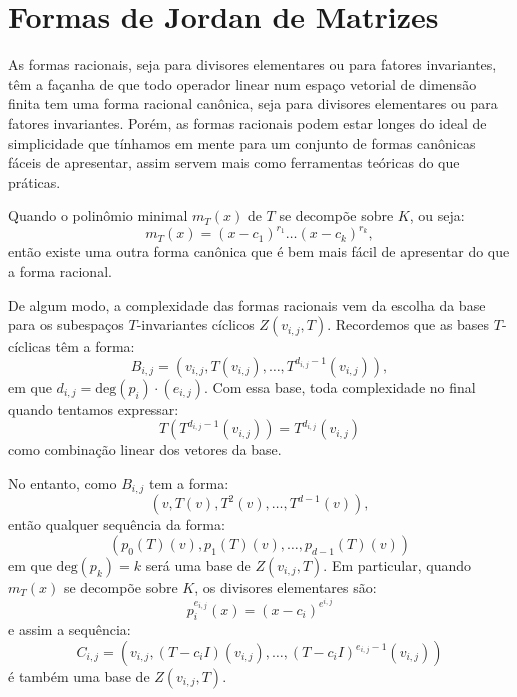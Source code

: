 \documentclass[11pt,twoside,a4paper]{book}
\begin{document}
\section{Formas de Jordan de Matrizes}

As formas racionais, seja para divisores elementares ou para fatores invariantes, têm a façanha de que todo operador linear num espaço vetorial de dimensão finita tem uma forma racional canônica, seja para divisores elementares ou para fatores invariantes. Porém, as formas racionais podem estar longes do ideal de simplicidade que tínhamos em mente para um conjunto de formas canônicas fáceis de apresentar, assim servem mais como ferramentas teóricas do que práticas.

\medskip
\noindent
Quando o polinômio minimal $m_T(x)$ de $T$ se decompõe sobre $K$, ou seja:
\[
m_T(x)=(x-c_1)^{r_1}\dots(x-c_k)^{r_k},
\]
então existe uma outra forma canônica que é bem mais fácil de apresentar do que a forma racional.

\medskip
\noindent
De algum modo, a complexidade das formas racionais vem da escolha da base para os subespaços $T$-invariantes cíclicos $Z(v_{i,j},T)$. Recordemos que as bases $T$-cíclicas
têm a forma:
\[
B_{i,j}=(v_{i,j},T(v_{i,j}),\dots,T^{d_{i,j}-1}(v_{i,j})),
\]
em que $d_{i,j}=\mathrm{deg}(p_i)\cdot(e_{i,j})$. Com essa base, toda complexidade no final quando tentamos expressar:
\[
T(T^{d_{i,j}-1}(v_{i,j}))=T^{d_{i,j}}(v_{i,j})
\]
como combinação linear dos vetores da base.

\medskip
\noindent
No entanto, como $B_{i,j}$ tem a forma:
\[
(v,T(v),T^2(v),\dots,T^{d-1}(v)),
\]
então qualquer sequência da forma:
\[
(p_0(T)(v),p_1(T)(v),\dots,p_{d-1}(T)(v))
\]
em que $\mathrm{deg}(p_k)=k$ será uma base de $Z(v_{i,j},T)$. Em particular, quando $m_T(x)$ se decompõe sobre $K$, os divisores elementares são:
\[
p_i^{e_{i,j}}(x)=(x-c_i)^{e^{i,j}}
\]
e assim a sequência:
\[
C_{i,j}=(v_{i,j},(T-c_iI)(v_{i,j}),\dots,(T-c_iI)^{e_{i,j}-1}(v_{i,j}))
\]
é também uma base de $Z(v_{i,j},T)$.
\end{document}
